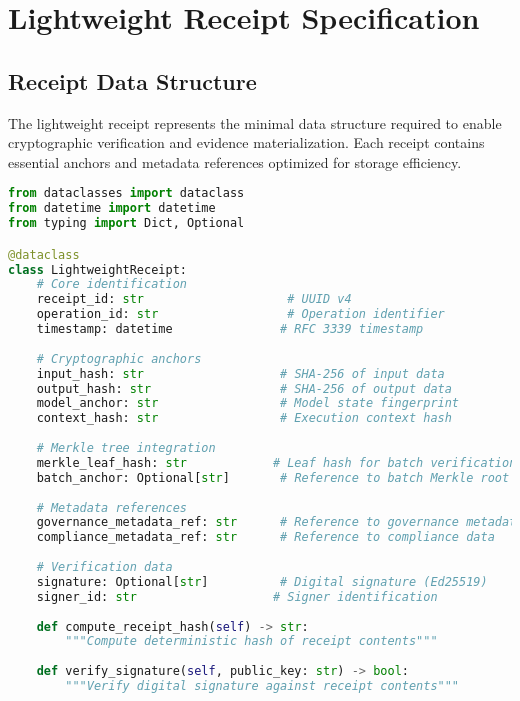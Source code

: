 \documentclass[12pt,a4paper]{article}
\begin{document}
\section{Lightweight Receipt Specification}

\subsection{Receipt Data Structure}

The lightweight receipt represents the minimal data structure required to enable cryptographic verification and evidence materialization. Each receipt contains essential anchors and metadata references optimized for storage efficiency.

\begin{lstlisting}[language=Python, caption=Lightweight Receipt Data Structure]
from dataclasses import dataclass
from datetime import datetime
from typing import Dict, Optional

@dataclass
class LightweightReceipt:
    # Core identification
    receipt_id: str                    # UUID v4
    operation_id: str                  # Operation identifier
    timestamp: datetime               # RFC 3339 timestamp
    
    # Cryptographic anchors
    input_hash: str                   # SHA-256 of input data
    output_hash: str                  # SHA-256 of output data
    model_anchor: str                 # Model state fingerprint
    context_hash: str                 # Execution context hash
    
    # Merkle tree integration
    merkle_leaf_hash: str            # Leaf hash for batch verification
    batch_anchor: Optional[str]       # Reference to batch Merkle root
    
    # Metadata references
    governance_metadata_ref: str      # Reference to governance metadata
    compliance_metadata_ref: str      # Reference to compliance data
    
    # Verification data
    signature: Optional[str]          # Digital signature (Ed25519)
    signer_id: str                   # Signer identification
    
    def compute_receipt_hash(self) -> str:
        """Compute deterministic hash of receipt contents"""
        
    def verify_signature(self, public_key: str) -> bool:
        """Verify digital signature against receipt contents"""
\end{lstlisting}
\end{document}
